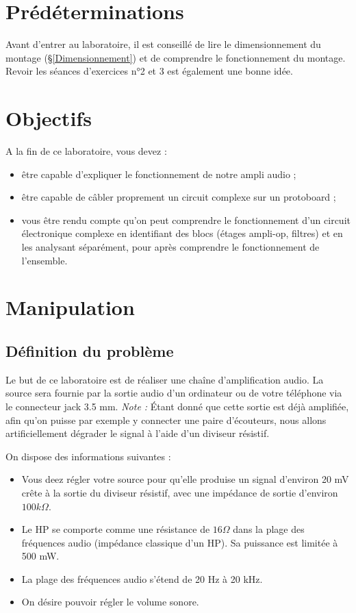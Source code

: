 \documentclass{../template/labo}
\begin{document}
\section{Prédéterminations} %
Avant d'entrer au laboratoire, il est conseillé de lire le dimensionnement du montage (§\ref{Dimensionnement}) et de comprendre le
fonctionnement du montage. Revoir les séances d'exercices n°2 et 3 est également une bonne idée.

\section{Objectifs}
A la fin de ce laboratoire, vous devez  :
\vspace{3mm}
\begin{itemize}
\item être capable d'expliquer le fonctionnement de notre ampli audio ;
\item être capable de câbler proprement un circuit complexe sur un protoboard ;
\item vous être rendu compte qu'on peut comprendre le fonctionnement d'un circuit électronique complexe en identifiant des blocs (étages ampli-op, filtres) et en les analysant séparément, pour après comprendre le fonctionnement de l'ensemble.
\end{itemize}



\section{Manipulation}
\subsection{Définition du problème}
Le but de ce laboratoire est de réaliser une chaîne d'amplification audio.
La source sera fournie par la sortie audio d'un ordinateur ou de votre téléphone via le connecteur jack 3.5 mm.
\textit{Note : }Étant donné que cette sortie est déjà amplifiée, afin qu'on puisse par exemple y connecter une paire d'écouteurs, nous allons artificiellement dégrader le signal à l'aide d'un diviseur résistif.

On dispose des informations suivantes :
\vspace{3mm}
\begin{itemize}
\item Vous deez régler votre source pour qu'elle produise un signal d'environ 20 mV crête à la sortie du diviseur résistif, avec une impédance de sortie d'environ $100k\Omega$.
\item Le HP se comporte comme une résistance de $16\Omega$ dans la plage des fréquences audio (impédance classique d'un HP). Sa puissance est limitée à 500 mW.
\item La plage des fréquences audio s'étend de 20 Hz à 20 kHz.
\item On désire pouvoir régler le volume sonore.
\end{itemize}
\end{document}
